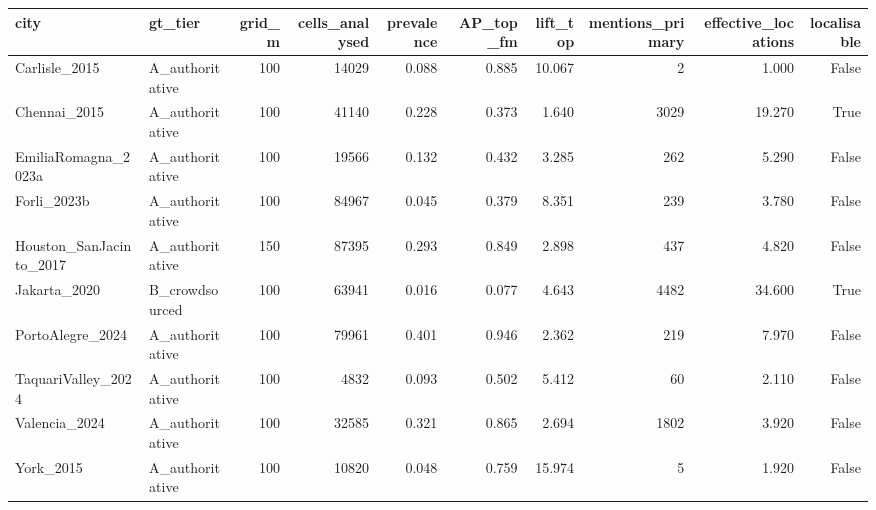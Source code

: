 \begin{tabular}{llrrrrrrrr}
\toprule
city & gt_tier & grid_m & cells_analysed & prevalence & AP_top_fm & lift_top & mentions_primary & effective_locations & localisable \\
\midrule
Carlisle\_2015 & A\_authoritative & 100 & 14029 & 0.088 & 0.885 & 10.067 & 2 & 1.000 & False \\
Chennai\_2015 & A\_authoritative & 100 & 41140 & 0.228 & 0.373 & 1.640 & 3029 & 19.270 & True \\
EmiliaRomagna\_2023a & A\_authoritative & 100 & 19566 & 0.132 & 0.432 & 3.285 & 262 & 5.290 & False \\
Forli\_2023b & A\_authoritative & 100 & 84967 & 0.045 & 0.379 & 8.351 & 239 & 3.780 & False \\
Houston\_SanJacinto\_2017 & A\_authoritative & 150 & 87395 & 0.293 & 0.849 & 2.898 & 437 & 4.820 & False \\
Jakarta\_2020 & B\_crowdsourced & 100 & 63941 & 0.016 & 0.077 & 4.643 & 4482 & 34.600 & True \\
PortoAlegre\_2024 & A\_authoritative & 100 & 79961 & 0.401 & 0.946 & 2.362 & 219 & 7.970 & False \\
TaquariValley\_2024 & A\_authoritative & 100 & 4832 & 0.093 & 0.502 & 5.412 & 60 & 2.110 & False \\
Valencia\_2024 & A\_authoritative & 100 & 32585 & 0.321 & 0.865 & 2.694 & 1802 & 3.920 & False \\
York\_2015 & A\_authoritative & 100 & 10820 & 0.048 & 0.759 & 15.974 & 5 & 1.920 & False \\
\bottomrule
\end{tabular}
